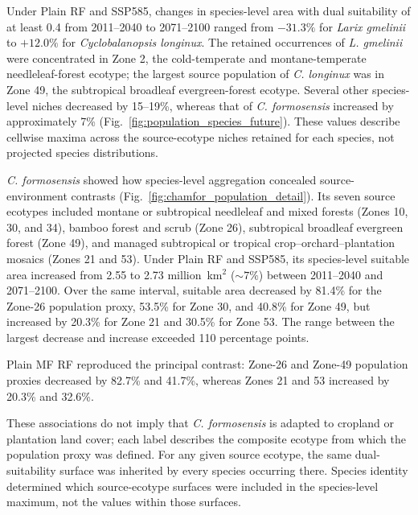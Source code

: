 \documentclass[11pt]{article}
\begin{document}
Under Plain RF and SSP585, changes in species-level area with dual suitability
of at least 0.4 from 2011--2040 to 2071--2100 ranged from $-31.3\%$ for
\textit{Larix gmelinii} to $+12.0\%$ for \textit{Cyclobalanopsis longinux}.
The retained occurrences of \textit{L. gmelinii} were concentrated in Zone 2,
the cold-temperate and montane-temperate needleleaf-forest ecotype; the largest
source population of \textit{C. longinux} was in Zone 49, the subtropical
broadleaf evergreen-forest ecotype. Several other species-level niches
decreased by 15--19\%, whereas that of \textit{C. formosensis} increased by
approximately 7\% (Fig.~\ref{fig:population_species_future}). These values
describe cellwise maxima across the source-ecotype niches retained for each
species, not projected species distributions.

\textit{C. formosensis} showed how species-level aggregation concealed
source-environment contrasts
(Fig.~\ref{fig:chamfor_population_detail}). Its seven source ecotypes included
montane or subtropical needleleaf and mixed forests (Zones 10, 30, and 34),
bamboo forest and scrub (Zone 26), subtropical broadleaf evergreen forest
(Zone 49), and managed subtropical or tropical crop--orchard--plantation
mosaics (Zones 21 and 53). Under Plain RF and SSP585, its species-level suitable
area increased from 2.55 to 2.73 million~km$^2$ ($\sim7\%$) between 2011--2040
and 2071--2100. Over the same interval, suitable area decreased by 81.4\% for
the Zone-26 population proxy, 53.5\% for Zone 30, and 40.8\% for Zone 49, but
increased by 20.3\% for Zone 21 and 30.5\% for Zone 53. The range between the
largest decrease and increase exceeded 110 percentage points.

Plain MF RF reproduced the principal contrast: Zone-26 and Zone-49 population
proxies decreased by 82.7\% and 41.7\%, whereas Zones 21 and 53 increased by
20.3\% and 32.6\%.

These associations do not imply that \textit{C. formosensis} is adapted to
cropland or plantation land cover; each label describes the composite ecotype
from which the population proxy was defined. For any given source ecotype, the
same dual-suitability surface was inherited by every species occurring there.
Species identity determined which source-ecotype surfaces were included in the
species-level maximum, not the values within those surfaces.
\end{document}
